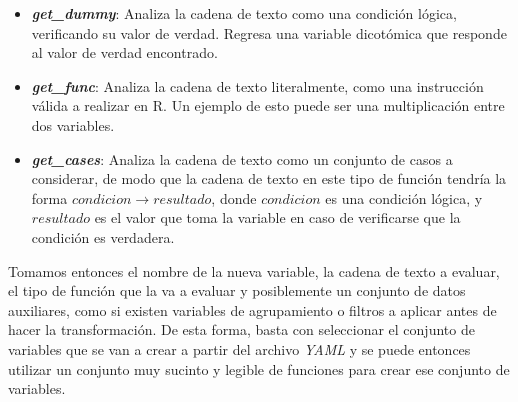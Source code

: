\begin{itemize}
    \item \textbf{\textit{get\_dummy}}: Analiza la cadena de texto como una condición lógica, verificando su valor de verdad. Regresa una variable dicotómica que responde al valor de verdad encontrado.
    \item \textbf{\textit{get\_func}}: Analiza la cadena de texto literalmente, como una instrucción válida a realizar en R. Un ejemplo de esto puede ser una multiplicación entre dos variables.
    \item \textbf{\textit{get\_cases}}: Analiza la cadena de texto como un conjunto de casos a considerar, de modo que la cadena de texto en este tipo de función tendría la forma $condicion \rightarrow resultado$, donde $condicion$ es una condición lógica, y $resultado$ es el valor que toma la variable en caso de verificarse que la condición es verdadera.
\end{itemize}
Tomamos entonces el nombre de la nueva variable, la cadena de texto a evaluar, el tipo de función que la va a evaluar y posiblemente un conjunto de datos auxiliares, como si existen variables de agrupamiento o filtros a aplicar antes de hacer la transformación. De esta forma, basta con seleccionar el conjunto de variables que se van a crear a partir del archivo \textit{YAML} y se puede entonces utilizar un conjunto muy sucinto y legible de funciones para crear ese conjunto de variables.
